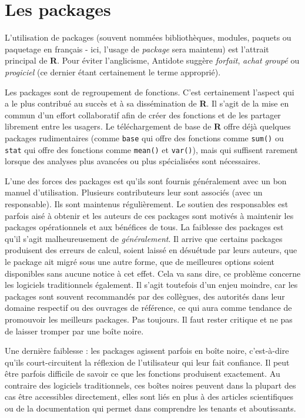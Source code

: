 \documentclass[
]{book}
\begin{document}
\hypertarget{les-packages}{%
\section{Les packages}\label{les-packages}}

L'utilisation de packages (souvent nommées bibliothèques, modules, paquets ou paquetage en français - ici, l'usage de \emph{package} sera maintenu) est l'attrait principal de \textbf{R}. Pour éviter l'anglicisme, Antidote suggère \emph{forfait}, \emph{achat groupé} ou \emph{progiciel} (ce dernier étant certainement le terme approprié).

Les packages sont de regroupement de fonctions. C'est certainement l'aspect qui a le plus contribué au succès et à sa dissémination de \textbf{R}. Il s'agit de la mise en commun d'un effort collaboratif afin de créer des fonctions et de les partager librement entre les usagers. Le téléchargement de base de \textbf{R} offre déjà quelques packages rudimentaires (comme \texttt{base} qui offre des fonctions comme \texttt{sum()} ou \texttt{stat} qui offre des fonctions comme \texttt{mean()} et \texttt{var()}), mais qui suffisent rarement lorsque des analyses plus avancées ou plus spécialisées sont nécessaires.

L'une des forces des packages est qu'ils sont fournis généralement avec un bon manuel d'utilisation. Plusieurs contributeurs leur sont associés (avec un responsable). Ils sont maintenus régulièrement. Le soutien des responsables est parfois aisé à obtenir et les auteurs de ces packages sont motivés à maintenir les packages opérationnels et aux bénéfices de tous. La faiblesse des packages est qu'il s'agit malheureusement de \emph{généralement}. Il arrive que certains packages produisent des erreurs de calcul, soient laissé en désuétude par leurs auteurs, que le package ait migré sous une autre forme, que de meilleures options soient disponibles sans aucune notice à cet effet. Cela va sans dire, ce problème concerne les logiciels traditionnels également. Il s'agit toutefois d'un enjeu moindre, car les packages sont souvent recommandés par des collègues, des autorités dans leur domaine respectif ou des ouvrages de référence, ce qui aura comme tendance de promouvoir les meilleurs packages. Pas toujours. Il faut rester critique et ne pas de laisser tromper par une boîte noire.

Une dernière faiblesse : les packages agissent parfois en boîte noire, c'est-à-dire qu'ils court-circuitent la réflexion de l'utilisateur qui leur fait confiance. Il peut être parfois difficile de savoir ce que les fonctions produisent exactement. Au contraire des logiciels traditionnels, ces boîtes noires peuvent dans la plupart des cas être accessibles directement, elles sont liés en plus à des articles scientifiques ou de la documentation qui permet dans comprendre les tenants et aboutissants.
\end{document}
